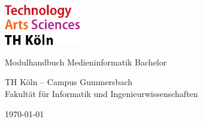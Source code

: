 
\begin{titlepage}

	\includegraphics[width=0.25\textwidth]{../../../assets/logo_th_koeln.pdf}

	\vspace{2cm}
	{\Huge\singlespacing\raggedright Modulhandbuch Medieninformatik Bachelor\par}
	\vspace{1cm}
	{\Large TH Köln – Campus Gummersbach \\ Fakultät für Informatik und Ingenieurwissenschaften\par}

	\vfill

	{\large \today\par}
\end{titlepage}

